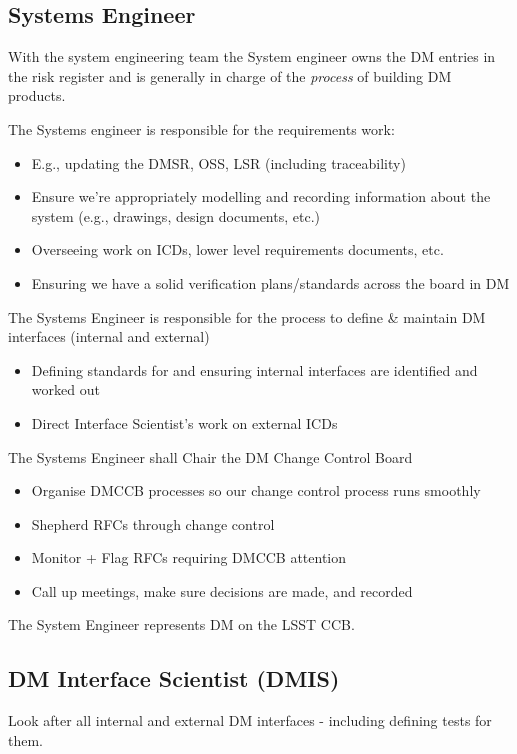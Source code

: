 \subsection{Systems Engineer \label{role:sysengineer}}
With the system engineering team  
 the System engineer 
 owns the DM entries in the risk register and is generally in charge of the {\em process} of building DM products. 

The Systems engineer  is responsible for the requirements work:
\begin{itemize}
\item E.g., updating the DMSR, OSS, LSR (including traceability)
\item Ensure we’re appropriately modelling and recording information about the system (e.g.,
    drawings, design documents, etc.)
\item Overseeing work on ICDs, lower level requirements documents, etc.
\item Ensuring we have a solid verification plans/standards across the board in DM
\end{itemize}

The Systems Engineer is responsible for the process to define \& maintain DM interfaces (internal and external) 
\begin{itemize}
\item Defining standards for and ensuring internal interfaces are identified and worked out
\item Direct Interface Scientist's work on external ICDs
\end{itemize}

The Systems Engineer shall Chair the DM Change Control Board 
\begin{itemize}
\item Organise DMCCB  processes so our change control process runs smoothly
\item Shepherd RFCs through change control
\item Monitor + Flag RFCs requiring DMCCB  attention
\item Call up meetings, make sure decisions are made, and recorded
\end{itemize}

The System Engineer represents DM on the LSST CCB.

\subsection{DM Interface Scientist (DMIS) \label{role:dmis}}
Look after all internal and external DM interfaces - including defining tests for them. 

